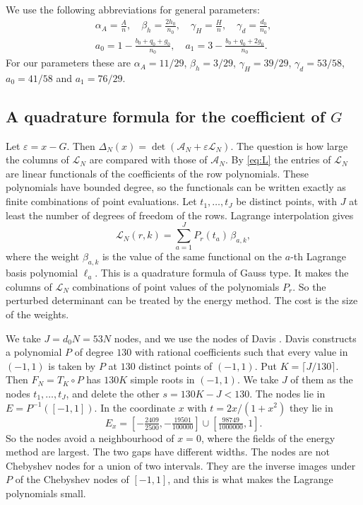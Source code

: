 \documentclass[11pt]{amsart}
\theoremstyle{definition}
\theoremstyle{remark}
\numberwithin{equation}{section}
\newcommand{\cA}{\mathcal A}
\newcommand{\cL}{\mathcal L}
\begin{document}
We use the following abbreviations for general parameters:
\begin{gather*}
 \alpha_A=\frac An,\quad \beta_h=\frac{2h_0}{n_0},\quad \gamma_H=\frac Hn,\quad \gamma_d=\frac{d_0}{n_0},\\
 a_0=1-\frac{b_0+q_0+g_0}{n_0},\quad a_1=3-\frac{b_0+q_0+2g_0}{n_0}.
\end{gather*}
For our parameters these are $\alpha_A=11/29$, $\beta_h=3/29$, $\gamma_H=39/29$, $\gamma_d=53/58$,
$a_0=41/58$ and $a_1=76/29$.

\subsection{A quadrature formula for the coefficient of $G$}\label{ssec:quadrature}
Let $\varepsilon=x-G$. Then $\Delta_N(x)=\det(\cA_N+\varepsilon\cL_N)$. The question is how large the columns
of $\cL_N$ are compared with those of $\cA_N$. By \eqref{eq:L} the entries of $\cL_N$ are linear
functionals of the coefficients of the row polynomials. These polynomials have bounded degree, so the
functionals can be written exactly as finite combinations of point evaluations. Let $t_1,\ldots,t_J$ be
distinct points, with $J$ at least the number of degrees of freedom of the rows. Lagrange interpolation
gives
\begin{equation}\label{eq:quad}
 \cL_N(r,k)=\sum_{a=1}^JP_r(t_a)\,\beta_{a,k},
\end{equation}
where the weight $\beta_{a,k}$ is the value of the same functional on the $a$-th Lagrange basis polynomial
$\ell_a$. This is a quadrature formula of Gauss type. It makes the columns of $\cL_N$ combinations of point
values of the polynomials $P_r$. So the perturbed determinant can be treated by the energy
method. The cost is the size of the weights.

We take $J=d_0N=53N$ nodes, and we use the nodes of Davis \cite{Davis2026}. Davis constructs a polynomial
$P$ of degree $130$ with rational coefficients such that every value in $(-1,1)$ is taken by $P$ at
$130$ distinct points of $(-1,1)$. Put $K=\lceil J/130\rceil$. Then $F_N=T_K\circ P$ has $130K$ simple
roots in $(-1,1)$. We take $J$ of them as the nodes $t_1,\ldots,t_J$, and delete the other $s=130K-J<130$.
The nodes lie in $E=P^{-1}([-1,1])$. In the coordinate $x$ with $t=2x/(1+x^2)$ they lie in
\[
 E_x=[-\tfrac{2409}{2500},-\tfrac{19501}{100000}]\cup[\tfrac{98749}{1000000},1].
\]
So the nodes avoid a neighbourhood of $x=0$, where the fields of the energy method are largest. The two
gaps have different widths. The nodes are not Chebyshev nodes for a union of two intervals. They are the
inverse images under $P$ of the Chebyshev nodes of $[-1,1]$, and this is what makes the Lagrange
polynomials small.
\end{document}
